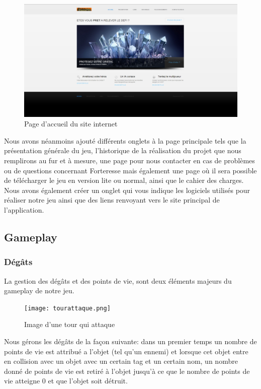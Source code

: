\documentclass[a4paper, 12pt]{article}
\begin{document}
	\begin{figure}[!ht]
		\centerline{\includegraphics[scale=0.3]{siteprojet.png}}
		\caption*{Page d'accueil du site internet}
	\end{figure}	 
	 
	 Nous avons néanmoins ajouté différents onglets à la page principale tels que la présentation générale du jeu, l’historique de la réalisation du projet que nous remplirons au fur et à mesure, une page pour nous contacter en cas de problèmes ou de questions concernant Forteresse mais également une page où il sera possible de télécharger le jeu en version lite ou normal, ainsi que le cahier des charges. Nous avons également créer un onglet qui vous indique les logiciels utilisés pour réaliser notre jeu ainsi que des liens renvoyant vers le site principal de l’application.

	\subsection{Gameplay}
		
		\subsubsection{Dégâts}
		La gestion des dégâts et des points de vie, sont deux éléments majeurs du gameplay de notre jeu.
	\begin{figure}[!ht]
		\centerline{\texttt{[image: tourattaque.png]}}
		\caption*{Image d'une tour qui attaque}
	\end{figure}		

		\par Nous gérons les dégâts de la façon suivante: dans un premier temps un nombre de points de vie est attribué a l'objet (tel qu'un ennemi) et lorsque cet objet entre en collision avec un objet avec un certain tag et un certain nom, un nombre donné de points de vie est retiré à l'objet jusqu'à ce que le nombre de points de vie atteigne 0 et que l'objet soit détruit.
\end{document}
